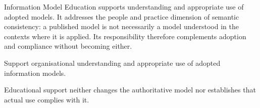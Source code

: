 Information Model Education supports understanding and appropriate use of adopted models. It addresses the people and practice dimension of semantic consistency: a published model is not necessarily a model understood in the contexts where it is applied. Its responsibility therefore complements adoption and compliance without becoming either.



Support organisational understanding and appropriate use of adopted information models.



Educational support neither changes the authoritative model nor establishes that actual use complies with it.


